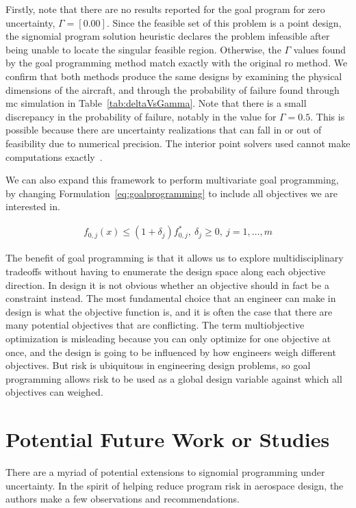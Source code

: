 Firstly, note that there are no results reported for the goal program
for zero uncertainty, $\Gamma = [0.00]$.
Since the feasible set of this problem is a point design, the signomial program
solution heuristic declares the problem infeasible after being
unable to locate the singular feasible region.
Otherwise, the $\Gamma$ values found by the goal programming method match exactly
with the original \gls{ro} method. We confirm that both methods produce
the same designs by examining the physical dimensions of the aircraft, and through the probability
of failure found through \gls{mc} simulation in Table~\ref{tab:deltaVsGamma}.
Note that there is a small discrepancy
in the probability of failure, notably in the value for $\Gamma = 0.5$. This is
possible because there are uncertainty realizations that can fall
in or out of feasibility due to numerical precision. The interior point solvers
used cannot make computations exactly~\cite{Nesterov1994}.

We can also expand this framework to perform multivariate goal programming,
by changing Formulation~\ref{eq:goalprogramming} to include all
objectives we are interested in.

\begin{align*}
    f_{0,j}(x) \leq (1+\delta_j) f^*_{0,j},~\delta_j \geq 0,~j = 1,\ldots, m
    \label{eq:multigoal}
\end{align*}

The benefit of goal programming is that it allows us to explore multidisciplinary tradeoffs without
having to enumerate the design space along each objective direction.
In design it is not obvious whether an objective should in fact be a constraint instead. The most
fundamental choice that an engineer can make in design is what the objective function is, and it is
often the case that there are many potential objectives that are conflicting.
The term multiobjective optimization is misleading
because you can only optimize for one objective at once,
and the design is going to be influenced by how engineers weigh different objectives.
But risk is ubiquitous in engineering design problems, so goal programming allows risk to be used as
a global design variable against which all objectives can weighed.

\section{Potential Future Work or Studies}

There are a myriad of potential extensions to signomial programming under uncertainty.
In the spirit of helping reduce program risk in aerospace design,
the authors make a few observations and recommendations.

